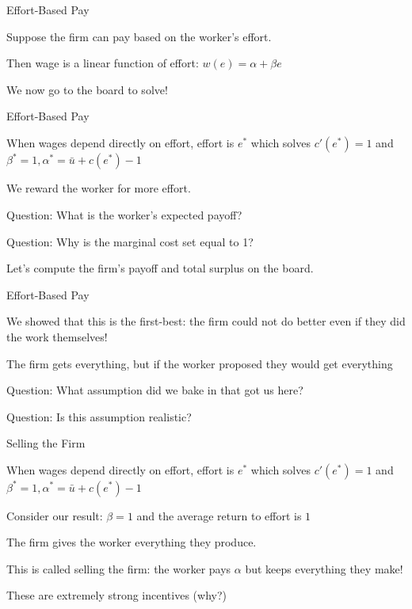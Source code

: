 \documentclass[aspectratio=169,usenames,dvipsnames]{beamer}
\newenvironment{wideitemize}{\itemize\addtolength{\itemsep}{10pt}}{\enditemize}
\begin{document}
\begin{frame}{Effort-Based Pay}
    \begin{wideitemize}
        \item Suppose the firm can pay based on the worker's effort.
        \item Then wage is a linear function of effort: $w(e)=\alpha + \beta e$
        \item We now go to the board to solve!
    \end{wideitemize}
\end{frame}
\begin{frame}{Effort-Based Pay}
   \begin{theorem}
        When wages depend directly on effort, effort is $e^*$ which solves $c'(e^*)=1$ and $\beta^*=1, \alpha^*=\bar u+c(e^*)-1$
    \end{theorem}

    \begin{wideitemize}
        \item We reward the worker for more effort.
        \item Question: What is the worker's expected payoff?
        \item Question: Why is the marginal cost set equal to 1?
        \item Let's compute the firm's payoff and total surplus on the board.
    \end{wideitemize}
\end{frame}

\begin{frame}{Effort-Based Pay}
    \begin{wideitemize}
        \item We showed that this is the first-best: the firm could not do better even if they did the work themselves!
        \item The firm gets everything, but if the worker proposed they would get everything
        \item Question: What assumption did we bake in that got us here?
        \item Question: Is this assumption realistic?
    \end{wideitemize}
\end{frame}

\begin{frame}{Selling the Firm}
 \begin{theorem}
        When wages depend directly on effort, effort is $e^*$ which solves $c'(e^*)=1$ and $\beta^*=1, \alpha^*=\bar u+c(e^*)-1$
    \end{theorem}
    \begin{wideitemize}
        \item Consider our result: $\beta=1$ and the average return to effort is $1$
        \item The firm gives the worker everything they produce.
        \item This is called selling the firm: the worker pays $\alpha$ but keeps everything they make!
        \item These are extremely strong incentives (why?)
    \end{wideitemize}
\end{frame}
\end{document}
